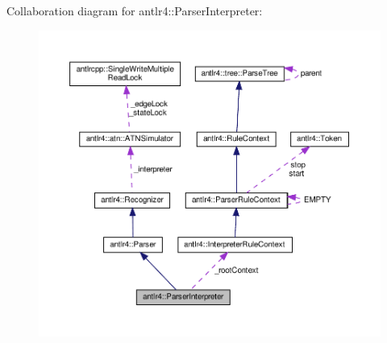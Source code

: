 Collaboration diagram for antlr4\+:\+:Parser\+Interpreter\+:
\nopagebreak
\begin{figure}[H]
\begin{center}
\leavevmode
\includegraphics[width=350pt]{classantlr4_1_1ParserInterpreter__coll__graph}
\end{center}
\end{figure}
